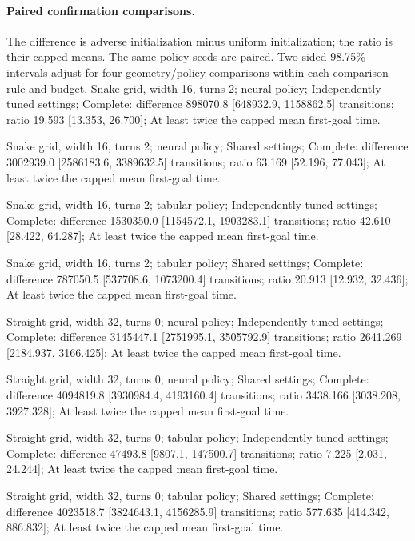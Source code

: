 \paragraph{Paired confirmation comparisons.} The difference is adverse initialization minus uniform initialization; the ratio is their capped means. The same policy seeds are paired. Two-sided 98.75\% intervals adjust for four geometry/policy comparisons within each comparison rule and budget.
\noindent Snake grid, width 16, turns 2; neural policy; Independently tuned settings; Complete: difference 898070.8 [648932.9, 1158862.5] transitions; ratio 19.593 [13.353, 26.700]; At least twice the capped mean first-goal time.\par
\noindent Snake grid, width 16, turns 2; neural policy; Shared settings; Complete: difference 3002939.0 [2586183.6, 3389632.5] transitions; ratio 63.169 [52.196, 77.043]; At least twice the capped mean first-goal time.\par
\noindent Snake grid, width 16, turns 2; tabular policy; Independently tuned settings; Complete: difference 1530350.0 [1154572.1, 1903283.1] transitions; ratio 42.610 [28.422, 64.287]; At least twice the capped mean first-goal time.\par
\noindent Snake grid, width 16, turns 2; tabular policy; Shared settings; Complete: difference 787050.5 [537708.6, 1073200.4] transitions; ratio 20.913 [12.932, 32.436]; At least twice the capped mean first-goal time.\par
\noindent Straight grid, width 32, turns 0; neural policy; Independently tuned settings; Complete: difference 3145447.1 [2751995.1, 3505792.9] transitions; ratio 2641.269 [2184.937, 3166.425]; At least twice the capped mean first-goal time.\par
\noindent Straight grid, width 32, turns 0; neural policy; Shared settings; Complete: difference 4094819.8 [3930984.4, 4193160.4] transitions; ratio 3438.166 [3038.208, 3927.328]; At least twice the capped mean first-goal time.\par
\noindent Straight grid, width 32, turns 0; tabular policy; Independently tuned settings; Complete: difference 47493.8 [9807.1, 147500.7] transitions; ratio 7.225 [2.031, 24.244]; At least twice the capped mean first-goal time.\par
\noindent Straight grid, width 32, turns 0; tabular policy; Shared settings; Complete: difference 4023518.7 [3824643.1, 4156285.9] transitions; ratio 577.635 [414.342, 886.832]; At least twice the capped mean first-goal time.\par
